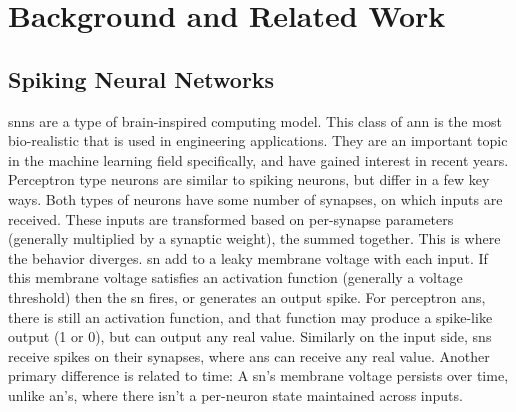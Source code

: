 %
%


\chapter{Background and Related Work}\label{chapter:background}
    \section{Spiking Neural Networks}
    \Glspl{snn} are a type of brain-inspired computing model. This class of
    \Gls{ann} is the most bio-realistic that is used in engineering
    applications. They are an important topic in the machine learning field
    specifically, and have gained interest in recent years. Perceptron type
    neurons are similar to spiking neurons, but differ in a few key ways. Both
    types of neurons have some number of synapses, on which inputs are
    received. These inputs are transformed based on per-synapse parameters
    (generally multiplied by a synaptic weight), the summed together. This is
    where the behavior diverges. \Gls{sn} add to a leaky membrane voltage with
    each input. If this membrane voltage satisfies an activation function
    (generally a voltage threshold) then the \gls{sn} fires, or generates an
    output spike. For perceptron \glspl{an}, there is still an activation
    function, and that function may produce a spike-like output (1 or 0), but
    can output any real value. Similarly on the input side, \glspl{sn} receive
    spikes on their synapses, where \glspl{an} can receive any real
    value. Another primary difference is related to time: A \gls{sn}'s membrane
    voltage persists over time, unlike \gls{an}'s, where there isn't a
    per-neuron state maintained across inputs.
    
